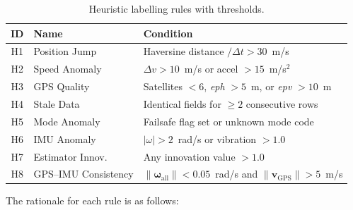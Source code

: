 \documentclass[electronics,article,accept,moreauthors]{Definitions/mdpi}
\begin{document}
\begin{table}[H]
\caption{Heuristic labelling rules with thresholds.\label{tab:heuristics}}
\begin{tabularx}{\textwidth}{clL}
\toprule
\textbf{ID} & \textbf{Name} & \textbf{Condition} \\
\midrule
H1 & Position Jump & Haversine distance $/ \Delta t > 30$~m/s \\
H2 & Speed Anomaly & $\Delta v > 10$~m/s or accel $> 15$~m/s$^2$ \\
H3 & GPS Quality & Satellites $< 6$, {\it eph} $> 5$~m, or {\it epv} $> 10$~m \\
H4 & Stale Data & Identical fields for $\geq 2$ consecutive rows \\
H5 & Mode Anomaly & Failsafe flag set or unknown mode code \\
H6 & IMU Anomaly & $|\omega| > 2$~rad/s or vibration $> 1.0$ \\
H7 & Estimator Innov. & Any innovation value $> 1.0$ \\
H8 & GPS--IMU Consistency & $\|\boldsymbol{\omega}_{\text{all}}\| < 0.05$~rad/s and $\|\mathbf{v}_{\text{GPS}}\| > 5$~m/s \\
\bottomrule
\end{tabularx}
\end{table}

The rationale for each rule is as follows:
\end{document}
